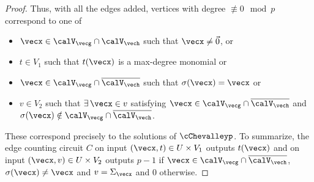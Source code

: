 \begin{proof}
 Thus, with all the edges added, vertices with degree $\not\equiv 0 \mod{p}$ correspond to one of\vspace{-2mm}
 \begin{itemize}
 \item $\vecx \in \calV_{\vecg} \cap \calV_{\vech}$ such that $\vecx \ne \vec{0}$, or
 \item $t \in V_1$ such that $t(\vecx)$ is a max-degree monomial or
 \item $\vecx \in \calV_{\vecg} \cap \overline{\calV_{\vech}}$ such that $\sigma(\vecx) = \vecx$ or
 \item $v \in V_2$ such that $\exists\, \vecx \in v$ satisfying $\vecx \in \calV_{\vecg} \cap \overline{\calV_{\vech}}$ and $\sigma(\vecx) \notin \calV_{\vecg} \cap \overline{\calV_{\vech}}$.
 \end{itemize}
 These correspond precisely to the solutions of $\cChevalleyp$. To summarize, the edge
 counting circuit $C$ on input $(\vecx, t) \in U \times V_1$ outputs
 $t(\vecx)$ and on input $(\vecx, v) \in U \times V_2$ outputs $p-1$ if
 $\vecx \in \calV_{\vecg} \cap \overline{\calV_{\vech}}$, $\sigma(\vecx) \ne \vecx$ and $v = \Sigma_{\vecx}$ and 0
 otherwise.



\end{proof}

